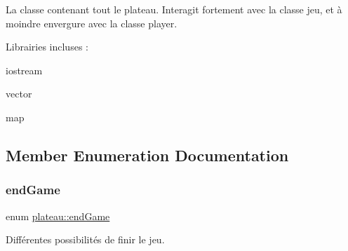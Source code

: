La classe contenant tout le plateau. Interagit fortement avec la classe jeu, et à moindre envergure avec la classe player.

Librairies incluses \+:
\begin{DoxyItemize}
\item iostream
\item vector
\item map 
\end{DoxyItemize}

\subsection{Member Enumeration Documentation}
\mbox{\label{classplateau_a94b54e0a84c850657a83176f812db222}} 
\subsubsection{\texorpdfstring{end\+Game}{endGame}}
{\footnotesize\ttfamily enum \hyperlink{classplateau_a94b54e0a84c850657a83176f812db222}{plateau\+::end\+Game}\hspace{0.3cm}{\ttfamily [private]}}



Différentes possibilités de finir le jeu. 

